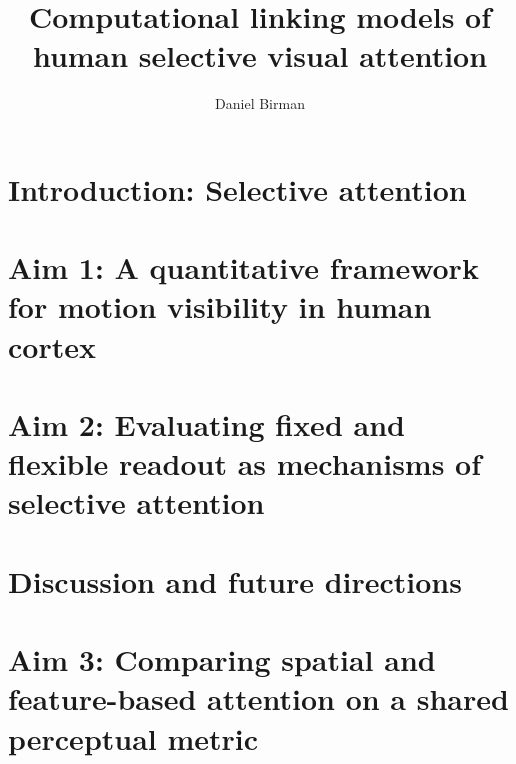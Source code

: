 \documentclass{report}
\begin{document}
\title{Computational linking models of\\human selective visual attention}
\author{Daniel Birman}

\beforepreface
{}

 


% 




\afterpreface

\chapter[Introduction]{Introduction: Selective attention}



\chapter[A framework for motion visibility]{Aim 1: A quantitative framework for motion visibility in human cortex}



\chapter[Fixed vs. flexible readout]{Aim 2: Evaluating fixed and flexible readout as mechanisms of selective attention}



\chapter[Discussion]{Discussion and future directions}

\chapter[Comparing spatial and feature-based attention]{Aim 3: Comparing spatial and feature-based attention on a shared perceptual metric}







\newpage
{}
\printbibliography
\end{document}
